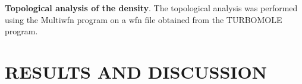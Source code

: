 \documentclass[12pt]{article}
\begin{document}
\textbf{Topological analysis of the density}. The topological analysis was performed using the Multiwfn
program on a wfn file obtained from the TURBOMOLE program.\cite{multiwfn}


\section*{\sffamily \Large RESULTS AND DISCUSSION}



%
%

%
\end{document}
